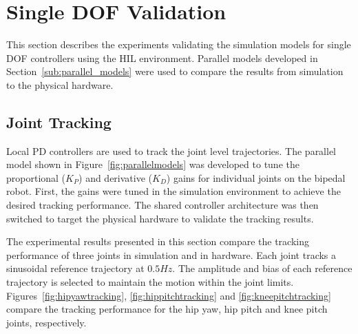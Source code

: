 

\section{Single DOF Validation} %
\label{sec:1dof_validation}
This section describes the experiments validating the simulation models for single DOF controllers using the HIL environment. Parallel models developed in Section~\ref{sub:parallel_models} were used to compare the results from simulation to the physical hardware. 

\subsection{Joint Tracking} %
\label{sub:joint_tracking}
Local PD controllers are used to track the joint level trajectories. The parallel model shown in Figure~\ref{fig:parallelmodels} was developed to tune the proportional ($K_P$) and derivative ($K_D$) gains for individual joints on the bipedal robot. First, the gains were tuned in the simulation environment to achieve the desired tracking performance. The shared controller architecture was then switched to target the physical hardware to validate the tracking results. 

The experimental results presented in this section compare the tracking performance of three joints in simulation and in hardware. Each joint tracks a sinusoidal reference trajectory at $0.5 Hz$. The amplitude and bias of each reference trajectory is selected to maintain the motion within the joint limits. Figures~\ref{fig:hipyawtracking}, \ref{fig:hippitchtracking} and \ref{fig:kneepitchtracking} compare the tracking performance for the hip yaw, hip pitch and knee pitch joints, respectively. 

